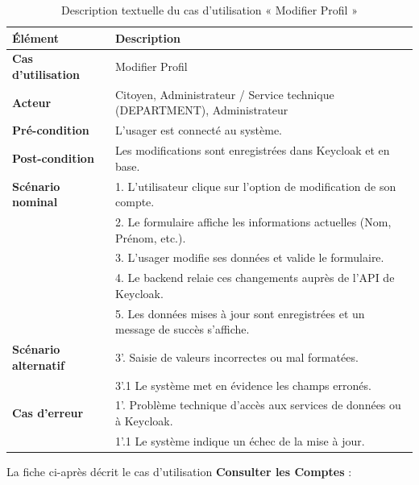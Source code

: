 \begin{table}[H]
    \centering
    \caption{Description textuelle du cas d'utilisation « Modifier Profil »}
    \label{tab:txt_modif_prof}
    \vspace{0.2cm}
    \small
    \begin{tabularx}{\textwidth}{|l|X|}
        \hline
        \textbf{Élément} & \textbf{Description} \\ \hline
        \textbf{Cas d’utilisation} & Modifier Profil \\ \hline
        \textbf{Acteur} & Citoyen, Administrateur / Service technique (DEPARTMENT), Administrateur \\ \hline
        \textbf{Pré-condition} & L'usager est connecté au système. \\ \hline
        \textbf{Post-condition} & Les modifications sont enregistrées dans Keycloak et en base. \\ \hline
        \textbf{Scénario nominal} &
        1. L'utilisateur clique sur l'option de modification de son compte.\\
        & 2. Le formulaire affiche les informations actuelles (Nom, Prénom, etc.).\\
        & 3. L'usager modifie ses données et valide le formulaire.\\
        & 4. Le backend relaie ces changements auprès de l'API de Keycloak.\\
        & 5. Les données mises à jour sont enregistrées et un message de succès s'affiche. \\ \hline
        \textbf{Scénario alternatif} &
        3'. Saisie de valeurs incorrectes ou mal formatées.\\
        & 3'.1 Le système met en évidence les champs erronés. \\ \hline
        \textbf{Cas d’erreur} &
        1'. Problème technique d'accès aux services de données ou à Keycloak.\\
        & 1'.1 Le système indique un échec de la mise à jour. \\ \hline
    \end{tabularx}
\end{table}

La fiche ci-après décrit le cas d'utilisation \textbf{\og Consulter les Comptes \fg{}} :

